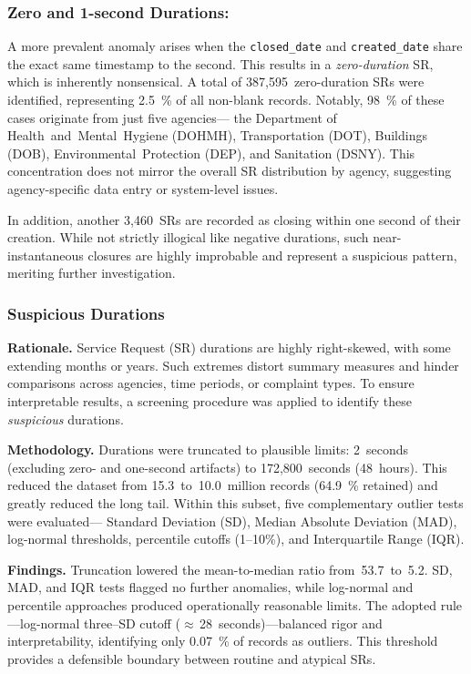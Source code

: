 \documentclass[linenumber]{jdsart}
\begin{document}
 \subsubsection{Zero and 1-second Durations:}
\label{subsubsec:zerodurations}
A more prevalent anomaly arises when the \texttt{closed\_date} and 
\texttt{created\_date} share the exact same timestamp to the second. 
This results in a \emph{zero-duration} \textsc{SR}, 
which is inherently nonsensical. 
A total of 387{,}595~zero-duration \textsc{SR}s were identified, 
representing \SI{2.5}{\percent} of all non-blank records. 
Notably, \SI{98}{\percent} of these cases originate from just five agencies—%
the Department of Health~and~Mental~Hygiene (\textsc{DOHMH}), 
Transportation (\textsc{DOT}), Buildings (\textsc{DOB}), 
Environmental~Protection (\textsc{DEP}), and 
Sanitation (\textsc{DSNY}). 
This concentration does not mirror the overall \textsc{SR} distribution 
by agency, suggesting agency-specific data entry or system-level issues.

In addition, another 3{,}460~\textsc{SR}s are recorded as closing within 
one second of their creation. 
While not strictly illogical like negative durations, such 
near-instantaneous closures are highly improbable and represent a 
suspicious pattern, meriting further investigation.

\subsubsection{Suspicious Durations}
\label{subsubsec:suspiciousdurations}
\textbf{Rationale.}  
Service Request (\textsc{SR}) durations are highly right-skewed, 
with some extending months or years. 
Such extremes distort summary measures and hinder comparisons across agencies, 
time periods, or complaint types. 
To ensure interpretable results, a screening procedure was applied 
to identify these \textit{suspicious} durations.

\textbf{Methodology.}  
Durations were truncated to plausible limits: 
2~seconds (excluding zero- and one-second artifacts) to 
172{,}800~seconds (48~hours). 
This reduced the dataset from 15.3~to~10.0~million records 
(\SI{64.9}{\percent} retained) and greatly reduced the long tail. 
Within this subset, five complementary outlier tests were evaluated—
Standard Deviation (SD), Median Absolute Deviation (MAD), 
log-normal thresholds, percentile cutoffs (1–10\%), 
and Interquartile Range (IQR).

\textbf{Findings.}  
Truncation lowered the mean-to-median ratio from~53.7~to~5.2. 
SD, MAD, and IQR tests flagged no further anomalies, 
while log-normal and percentile approaches produced 
operationally reasonable limits. 
The adopted rule—log-normal three–SD cutoff 
($\approx$\,28~seconds)—balanced rigor and interpretability, 
identifying only \SI{0.07}{\percent} of records as outliers. 
This threshold provides a defensible boundary 
between routine and atypical \textsc{SR}s.
\end{document}
